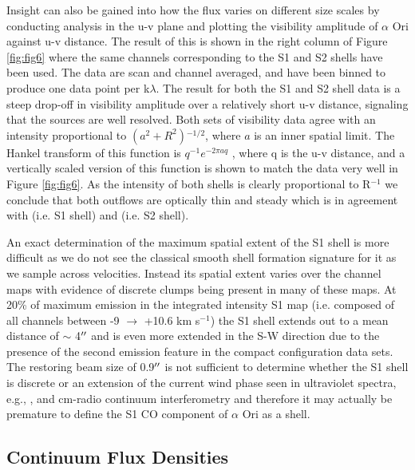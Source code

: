 \documentclass[iop]{emulateapj}
\begin{document}
Insight can also be gained into how the flux varies on different size scales by conducting analysis in the u-v plane and plotting the visibility amplitude of $\alpha$ Ori against u-v distance. The result of this is shown in the right column of Figure \ref{fig:fig6} where the same channels corresponding to the S1 and S2 shells have been used. The data are scan and channel averaged, and have been binned to produce one data point per k$\lambda$. The result for both the S1 and S2 shell data is a steep drop-off in visibility amplitude over a relatively short u-v distance, signaling that the sources are well resolved. Both sets of visibility data agree with an intensity proportional to $(a^2 + R^2){}^{-1/2}$, where $a$ is an inner spatial limit. The Hankel transform of this function is $q^{-1}e^{-2\pi aq}$ \citep{2000fta..book.....B}, where q is the u-v distance, and a vertically scaled version of this function is shown to match the data very well in Figure \ref{fig:fig6}. As the intensity of both shells is clearly proportional to R${}^{-1}$ we conclude that both outflows are  optically thin and steady which is in agreement with \cite{2009AJ....137.3558S} (i.e. S1 shell) and \cite{2002A&A...386.1009P} (i.e. S2 shell). 

An exact determination of the maximum spatial extent of the S1 shell is more difficult as we do not see the classical smooth shell formation signature for it as we sample across velocities. Instead its spatial extent varies over the channel maps with evidence of discrete clumps being present in many of these maps. At 20\% of maximum emission in the integrated intensity S1 map (i.e. composed of all channels between -9 $\rightarrow$ +10.6 km s${}^{-1}$) the S1 shell extends out to a mean distance of $\sim$ 4$\mbox{$^{\prime\prime}$}$ and is even more extended in the S-W direction due to the presence of the second emission feature in the compact configuration data sets. The restoring beam size of 0.9$\mbox{$^{\prime\prime}$}$ is not sufficient to determine whether the S1 shell is discrete or an extension of the current wind phase seen in ultraviolet spectra, e.g., \citep{1997ApJ...479..970C}, and cm-radio continuum interferometry \citep{1998Natur.392..575L, harper_2001} and therefore it may actually be premature to define the S1 CO component of $\alpha$ Ori as a shell.

\subsection{Continuum Flux Densities} \label{results4} 
\end{document}

